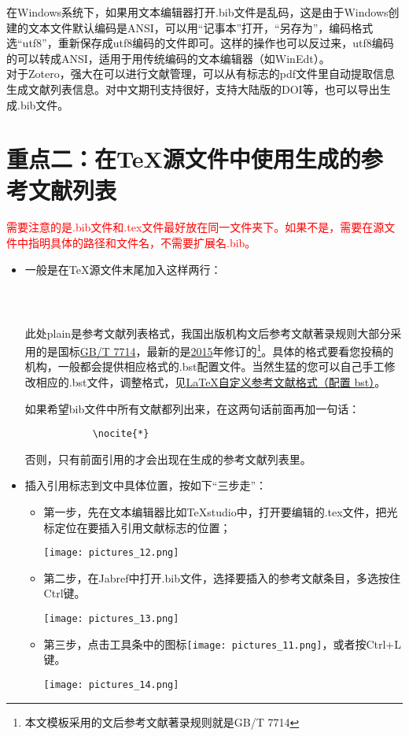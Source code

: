 \documentclass[cn,geye,cyan,normal,14pt]{elegantnote}
\begin{document}
	\begin{note}
在Windows系统下，如果用文本编辑器打开.bib文件是乱码，这是由于Windows创建的文本文件默认编码是ANSI，可以用“记事本”打开，“另存为”，编码格式选“utf8”，重新保存成utf8编码的文件即可。这样的操作也可以反过来，utf8编码的可以转成ANSI，适用于用传统编码的文本编辑器（如WinEdt）。\\
对于Zotero，强大在可以进行文献管理，可以从有标志的pdf文件里自动提取信息生成文献列表信息。对中文期刊支持很好，支持大陆版的DOI等，也可以导出生成.bib文件。
	\end{note}
\section{重点二：在\TeX 源文件中使用生成的参考文献列表}
\textcolor{red}{需要注意的是.bib文件和.tex文件最好放在同一文件夹下。如果不是，需要在源文件中指明具体的路径和文件名，不需要扩展名.bib。}
\begin{itemize}
	\item 一般是在\TeX 源文件末尾加入这样两行：
		\begin{lstlisting}
			
			
		\end{lstlisting}
			\begin{note}
				此处plain是参考文献列表格式，我国出版机构文后参考文献著录规则大部分采用的是国标\href{http://www.sac.gov.cn/SACSearch/outlinetemplet/gjbzcx.jsp}{GB/T 7714}，最新的是\href{http://www.scal.edu.cn/dxtsgxb/201906120155}{2015}年修订的\footnote{本文模板采用的文后参考文献著录规则就是GB/T 7714}。具体的格式要看您投稿的机构，一般都会提供相应格式的.bst配置文件。当然生猛的您可以自己手工修改相应的.bst文件，调整格式，见\href{https://blog.csdn.net/chikily_yongfeng/article/details/86553359}{\LaTeX 自定义参考文献格式（配置 bst）}。
			\end{note}
如果希望bib文件中所有文献都列出来，在这两句话前面再加一句话：
		\begin{lstlisting}
			\nocite{*}
		\end{lstlisting}
否则，只有前面引用的才会出现在生成的参考文献列表里。
	\item 插入引用标志到文中具体位置，按如下“三步走”：
		\begin{itemize}
			\item 第一步，先在文本编辑器比如\TeX studio中，打开要编辑的.tex文件，把光标定位在要插入引用文献标志的位置；
			\begin{center}
			\texttt{[image: pictures\_12.png]}
			\end{center}
		\item 第二步，在Jabref中打开.bib文件，选择要插入的参考文献条目，多选按住Ctrl键。
			\begin{center}
			\texttt{[image: pictures\_13.png]}
			\end{center}
		\item 第三步，点击工具条中的图标\texttt{[image: pictures\_11.png]}，或者按Ctrl+L键。
			\begin{center}
			\texttt{[image: pictures\_14.png]}
			\end{center}
		\end{itemize}
\end{itemize}
\end{document}

